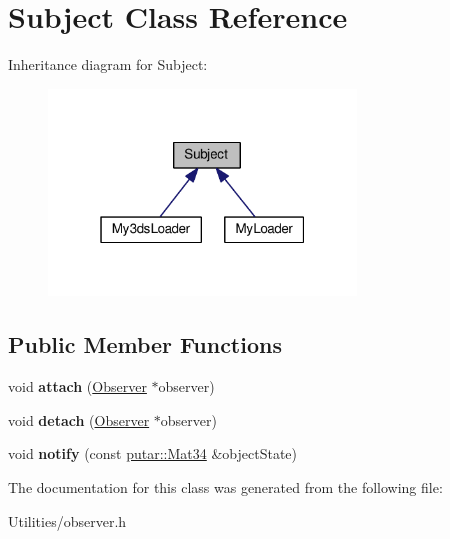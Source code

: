 \hypertarget{classSubject}{}\section{Subject Class Reference}
\label{classSubject}


Inheritance diagram for Subject\+:
\nopagebreak
\begin{figure}[H]
\begin{center}
\leavevmode
\includegraphics[width=232pt]{classSubject__inherit__graph}
\end{center}
\end{figure}
\subsection*{Public Member Functions}
\begin{DoxyCompactItemize}
\item 
void {\bfseries attach} (\hyperlink{classObserver}{Observer} $\ast$observer)\hypertarget{classSubject_a0884bfe374d352c6488a1e40c84246c8}{}\label{classSubject_a0884bfe374d352c6488a1e40c84246c8}

\item 
void {\bfseries detach} (\hyperlink{classObserver}{Observer} $\ast$observer)\hypertarget{classSubject_a752a7596d52ab986539232f8377ca92c}{}\label{classSubject_a752a7596d52ab986539232f8377ca92c}

\item 
void {\bfseries notify} (const \hyperlink{namespaceputar_a8bf3c8025ae8f60f553a752014c9849a}{putar\+::\+Mat34} \&object\+State)\hypertarget{classSubject_a7776ffd834c150b7e326489c69497e00}{}\label{classSubject_a7776ffd834c150b7e326489c69497e00}

\end{DoxyCompactItemize}


The documentation for this class was generated from the following file\+:\begin{DoxyCompactItemize}
\item 
Utilities/observer.\+h\end{DoxyCompactItemize}
